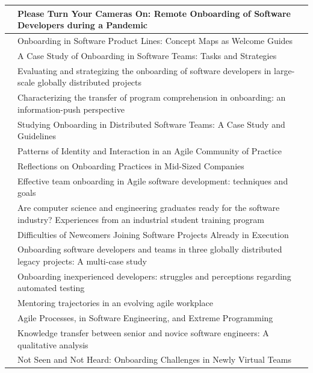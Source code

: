 \documentclass[utf8]{gradu3}
\begin{document}
\begin{footnotesize}
\begin{longtable}{ m{4cm}  m{10.5cm} }
\textcite{rodeghero-ym-2021} & Please Turn Your Cameras On: Remote Onboarding of Software Developers during a Pandemic \\
\hline
\textcite{azanza-ym-2021} & Onboarding in Software Product Lines: Concept Maps as Welcome Guides \\
\hline
\textcite{ju-ym-2021} & A Case Study of Onboarding in Software Teams: Tasks and Strategies \\
\hline
\textcite{britto-ym-2020} & Evaluating and strategizing the onboarding of software developers in large-scale globally distributed projects\\
\hline
\textcite{yates-ym-2020} & Characterizing the transfer of program comprehension in onboarding: an information-push perspective\\
\hline
\textcite{moe-ym-2020} & Studying Onboarding in Distributed Software Teams: A Case Study and Guidelines \\
\hline
\textcite{kumar-wallace-2019} & Patterns of Identity and Interaction in an Agile Community of Practice \\
\hline
\textcite{viviani-murphy-2019} & Reflections on Onboarding Practices in Mid-Sized Companies \\
\hline
\textcite{buchan-ym-2019} & Effective team onboarding in Agile software development: techniques and goals \\
\hline
\textcite{tuzun-ym-2018} & Are computer science and engineering graduates ready for the software industry? Experiences from an industrial student training program \\
\hline
\textcite{matturro-ym-2017} & Difficulties of Newcomers Joining Software Projects Already in Execution \\
\hline
\textcite{britto-ym-2017} & Onboarding software developers and teams in three globally distributed legacy projects: A multi-case study \\
\hline
\textcite{pham-ym-2017} & Onboarding inexperienced developers: struggles and perceptions regarding automated testing \\
\hline
\textcite{kumar-ym-2016} & Mentoring trajectories in an evolving agile workplace \\
\hline
\textcite{shannon-pool-2016} & Agile Processes, in Software Engineering, and Extreme Programming \\
\hline
\textcite{viana-ym-2014} & Knowledge transfer between senior and novice software engineers: A qualitative analysis \\
\hline
\textcite{hemphill-begel-2011} & Not Seen and Not Heard: Onboarding Challenges in Newly Virtual Teams \\

\end{longtable}
\end{footnotesize}
\end{document}
